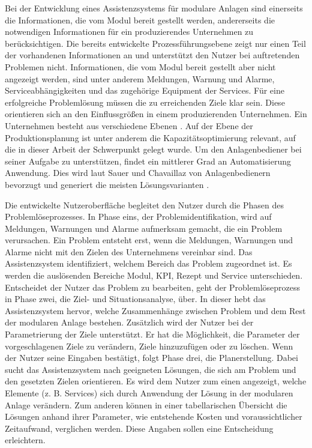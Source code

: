 Bei der Entwicklung eines Assistenzsystems für modulare Anlagen sind einerseits die Informationen, die vom Modul bereit gestellt werden, andererseits die notwendigen Informationen für ein produzierendes Unternehmen zu berücksichtigen. Die bereits entwickelte Prozessführungsebene zeigt nur einen Teil der vorhandenen Informationen an und unterstützt den Nutzer bei auftretenden Problemen nicht. Informationen, die vom Modul bereit gestellt aber nicht angezeigt werden, sind unter anderem Meldungen, Warnung und Alarme, Serviceabhängigkeiten und das zugehörige Equipment der Services. Für eine erfolgreiche Problemlösung müssen die zu erreichenden Ziele klar sein. Diese orientieren sich an den Einflussgrößen in einem produzierenden Unternehmen. Ein Unternehmen besteht aus verschiedene Ebenen . Auf der Ebene der Produktionsplanung ist unter anderem die Kapazitätsoptimierung relevant, auf die in dieser Arbeit der Schwerpunkt gelegt wurde. Um den Anlagenbediener bei seiner Aufgabe zu unterstützen, findet ein mittlerer Grad an Automatisierung Anwendung. Dies wird laut Sauer und Chavaillaz \cite{Sauer2018} von Anlagenbedienern bevorzugt und generiert die meisten Lösungsvarianten \cite{Miller2005}.

Die entwickelte Nutzeroberfläche begleitet den Nutzer durch die Phasen des Problemlöseprozesses. In Phase eins, der Problemidentifikation, wird auf Meldungen, Warnungen und Alarme aufmerksam gemacht, die ein Problem verursachen. Ein Problem entsteht erst, wenn die Meldungen, Warnungen und Alarme nicht mit den Zielen des Unternehmens vereinbar sind. Das Assistenzsystem identifiziert, welchem Bereich das Problem zugeordnet ist. Es werden die auslösenden Bereiche Modul, KPI, Rezept und Service unterschieden. Entscheidet der Nutzer das Problem zu bearbeiten, geht der Problemlöseprozess in Phase zwei, die Ziel- und Situationsanalyse, über. In dieser hebt das Assistenzsystem hervor, welche Zusammenhänge zwischen Problem und dem Rest der modularen Anlage bestehen. Zusätzlich wird der Nutzer bei der Parametrierung der Ziele unterstützt. Er hat die Möglichkeit, die Parameter der vorgeschlagenen Ziele zu verändern, Ziele hinzuzufügen oder zu löschen. Wenn der Nutzer seine Eingaben bestätigt, folgt Phase drei, die Planerstellung. Dabei sucht das Assistenzsystem nach geeigneten Lösungen, die sich am Problem und den gesetzten Zielen orientieren. Es wird dem Nutzer zum einen angezeigt, welche Elemente (z. B. Services) sich durch Anwendung der Lösung in der modularen Anlage verändern. Zum anderen können in einer tabellarischen Übersicht die Lösungen anhand ihrer Parameter, wie entstehende Kosten und voraussichtlicher Zeitaufwand, verglichen werden. Diese Angaben sollen eine Entscheidung erleichtern.

